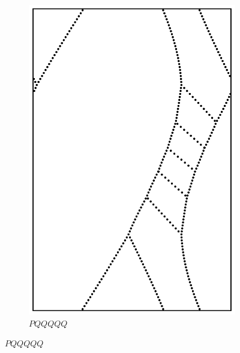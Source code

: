\documentclass[12pt,twoside]{reedthesis}
\theoremstyle{definition}
\begin{document}
\begin{figure}[h]
\begin{subfigure}[t]{0.24\textwidth}
    \includegraphics[width=\textwidth]{figures/string_cheese_appendix/pqqqqq.pdf}
    \caption*{$PQQQQQ$}
    \vspace{5mm}
  \end{subfigure}
\end{figure}


\printbibliography[heading=bibintoc]
\end{document}
